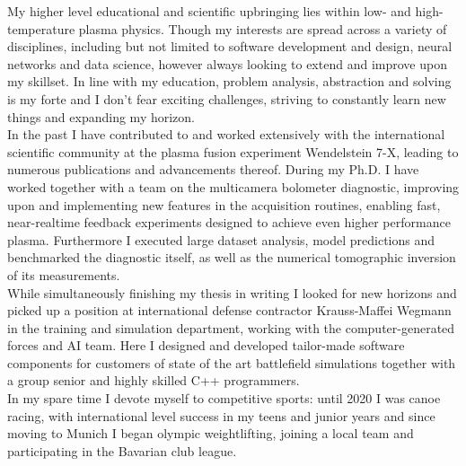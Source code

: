\documentclass[11pt,a4paper]{moderncv}
\begin{document}
%
My higher level educational and scientific upbringing lies within low- and high-temperature plasma physics. Though my interests are spread across a variety of disciplines, including but not limited to software development and design, neural networks and data science, however always looking to extend and improve upon my skillset. In line with my education, problem analysis, abstraction and solving is my forte and I don't fear exciting challenges, striving to constantly learn new things and expanding my horizon.\\[0.25cm]%
%
In the past I have contributed to and worked extensively with the international scientific community at the plasma fusion experiment Wendelstein 7-X, leading to numerous publications and advancements thereof.  During my Ph.D. I have worked together with a team on the multicamera bolometer diagnostic, improving upon and implementing new features in the acquisition routines, enabling fast, near-realtime feedback experiments designed to achieve even higher performance plasma. Furthermore I executed large dataset analysis, model predictions and benchmarked the diagnostic itself, as well as the numerical tomographic inversion of its measurements.\\[0.25cm]%
%
While simultaneously finishing my thesis in writing I looked for new horizons and picked up a position at international defense contractor Krauss-Maffei Wegmann in the training and simulation department, working with the computer-generated forces and AI team. Here I designed and developed tailor-made software components for customers of state of the art battlefield simulations together with a group senior and highly skilled C++ programmers.\\[0.25cm]%
%
In my spare time I devote myself to competitive sports: until 2020 I was canoe racing, with international level success in my teens and junior years and since moving to Munich I began olympic weightlifting, joining a local team and participating in the Bavarian club league.\\[0.25cm]%
\end{document}
